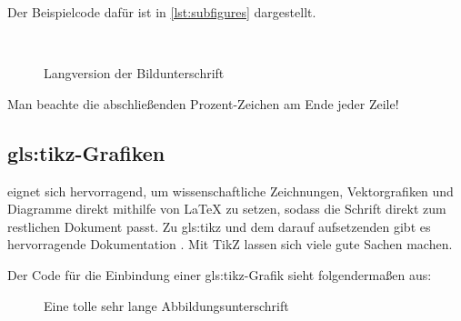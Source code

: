 Der Beispielcode dafür ist in \cref{lst:subfigures} dargestellt.

\begin{latex}[caption={Unterabbildungen in LaTeX},label={lst:subfigures}]
\begin{figure}[h]%
	\centering%
	\hfill%
	\\%
	\hfill%
\caption[Kurzversion]{Langversion der Bildunterschrift}%
\label{fig:MeinGanzesBild}%
\end{figure}
\end{latex}

Man beachte die abschließenden Prozent-Zeichen am Ende jeder Zeile!

\subsection[TikZ-Grafiken]{\gls{gls:tikz}-Grafiken}%
\label{sec:TikZ}
%
 eignet sich hervorragend, um wissenschaftliche Zeichnungen,
Vektorgrafiken und Diagramme direkt mithilfe von LaTeX
zu setzen, sodass die Schrift direkt zum restlichen Dokument passt.
Zu \gls{gls:tikz} und dem darauf aufsetzenden  gibt
es hervorragende Dokumentation \parencites{Tantau2013}{Feuersaenger2014}.
Mit TikZ lassen sich viele gute Sachen machen.


Der Code für die Einbindung einer \gls{gls:tikz}-Grafik sieht folgendermaßen aus:
\begin{latex}[caption={Einbindung einer TikZ-Zeichnung in LaTeX},label={lst:tikz-figure}]
\begin{figure}[h]%
  \centering%
  \resizebox{\textwidth}{!}{%
  }%
  \caption[Kurzversion für das Abbildungsverzeichnis]{%
           Eine tolle sehr lange Abbildungsunterschrift}%
  \label{fig:my-tikz-figure}%
\end{figure}
\end{latex}

